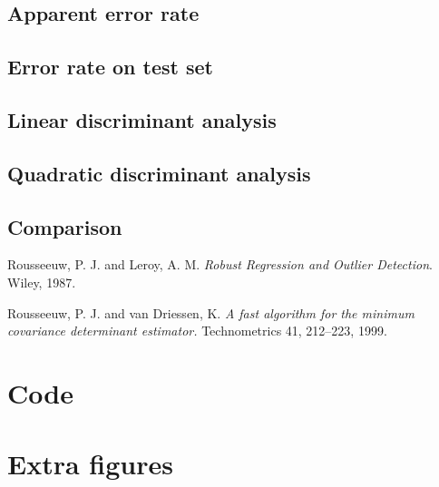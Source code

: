 \documentclass[a4paper, 12pt]{article}
\begin{document}
\subsection*{Apparent error rate}
\subsection*{Error rate on test set}
\subsection*{Linear discriminant analysis}
\subsection*{Quadratic discriminant analysis}
\subsection*{Comparison}


\begin{thebibliography}{9}
Rousseeuw, P. J. and Leroy, A. M. 
\textit{Robust Regression and Outlier Detection}. 
Wiley, 1987.

Rousseeuw, P. J. and van Driessen, K.
\textit{A fast algorithm for the minimum covariance determinant estimator.}
Technometrics 41, 212–223, 1999.
\end{thebibliography}


\clearpage
\appendix

\section{Code}
\FloatBarrier
{}







\clearpage
\FloatBarrier
\section{Extra figures}
\end{document}
